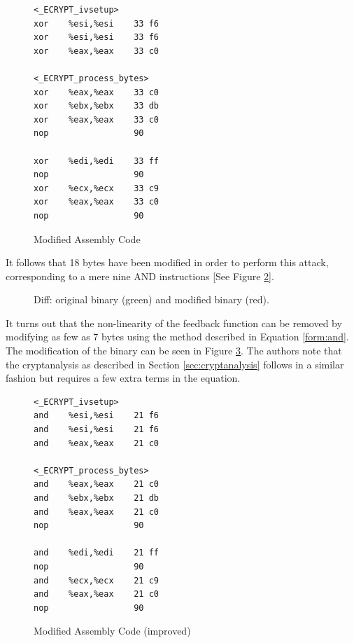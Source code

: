 \documentclass[conference]{IEEEtran}
\begin{document}
\begin{figure}[H]
\begin{lstlisting}[style=asm, frame=tlrb]
<_ECRYPT_ivsetup>
xor    %esi,%esi    33 f6
xor    %esi,%esi    33 f6
xor    %eax,%eax    33 c0

<_ECRYPT_process_bytes>
xor    %eax,%eax    33 c0
xor    %ebx,%ebx    33 db 
xor    %eax,%eax    33 c0
nop                 90

xor    %edi,%edi    33 ff
nop                 90
xor    %ecx,%ecx    33 c9
xor    %eax,%eax    33 c0
nop                 90
\end{lstlisting}
\caption{Modified Assembly Code}\label{fig:mod-asm}
\end{figure}

It follows that 18 bytes have been modified in order to perform this attack, corresponding to a mere nine AND instructions [See Figure \ref{fig:diff}].

\begin{figure}[H]
\centering
{}
\caption{Diff: original binary (green) and modified binary (red).}
\label{fig:diff}
\end{figure}

It turns out that the non-linearity of the feedback function can be removed by modifying as few as 7 bytes using the method described in Equation \ref{form:and}. The modification of the binary can be seen in Figure \ref{fig:mod-asm-imp}. The authors note that the cryptanalysis as described in Section \ref{sec:cryptanalysis} follows in a similar fashion but requires a few extra terms in the equation.

\begin{figure}[H]
\begin{lstlisting}[style=asm, frame=tlrb]
<_ECRYPT_ivsetup>
and    %esi,%esi    21 f6
and    %esi,%esi    21 f6
and    %eax,%eax    21 c0

<_ECRYPT_process_bytes>
and    %eax,%eax    21 c0
and    %ebx,%ebx    21 db 
and    %eax,%eax    21 c0
nop                 90

and    %edi,%edi    21 ff
nop                 90
and    %ecx,%ecx    21 c9
and    %eax,%eax    21 c0
nop                 90
\end{lstlisting}
\caption{Modified Assembly Code (improved)}\label{fig:mod-asm-imp}
\end{figure}
\end{document}
